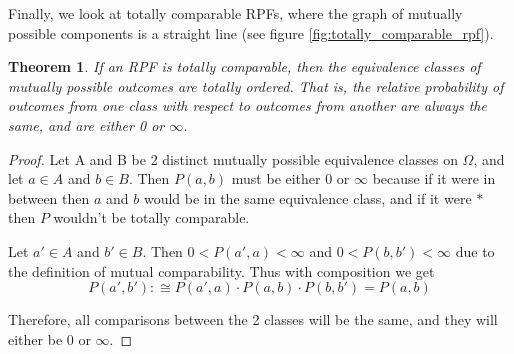 \documentclass[twoside]{article}
\theoremstyle{plain}%
\newtheorem{theorem}{Theorem}[section]
\theoremstyle{definition}
\theoremstyle{remark}
\begin{document}
Finally, we look at totally comparable RPFs, where the graph of mutually possible components is a straight line (see figure \ref{fig:totally_comparable_rpf}).

\begin{theorem}
If an RPF is totally comparable, then the equivalence classes of mutually possible outcomes are \textit{totally ordered}. That is, the relative probability of outcomes from one class with respect to outcomes from another are always the same, and are either 0 or \(\infty\).
\end{theorem}

\begin{proof}
Let A and B be 2 distinct mutually possible equivalence classes on \(\Omega\), and let \(a \in A\) and \(b \in B\). Then \(P(a, b)\) must be either 0 or \(\infty\) because if it were in between then \(a\) and \(b\) would be in the same equivalence class, and if it were \(\ast\) then \(P\) wouldn't be totally comparable.

Let \(a' \in A\) and \(b' \in B\). Then \(0 < P(a', a) < \infty\) and \(0 < P(b, b') < \infty\) due to the definition of mutual comparability. Thus with composition we get
\[P(a', b') :\cong P(a', a) \cdot P(a, b) \cdot P(b, b') = P(a, b)\]

Therefore, all comparisons between the 2 classes will be the same, and they will either be 0 or \(\infty\).
\end{proof}
\end{document}
